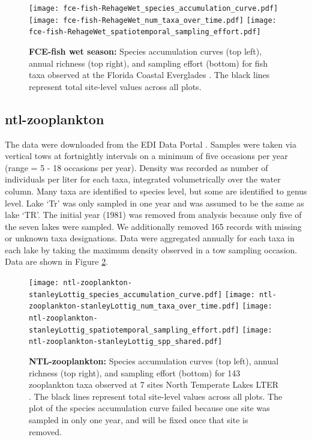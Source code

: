 \documentclass[11pt, oneside]{article}
\begin{document}
\begin{figure}[h!]
\centering
\texttt{[image: fce-fish-RehageWet\_species\_accumulation\_curve.pdf]}
\texttt{[image: fce-fish-RehageWet\_num\_taxa\_over\_time.pdf]}
\texttt{[image: fce-fish-RehageWet\_spatiotemporal\_sampling\_effort.pdf]}
\caption{{\bf FCE-fish wet season:} Species accumulation curves (top left),  annual richness (top right), and sampling effort (bottom)  for fish taxa observed at the Florida Coastal Everglades . The black lines represent total site-level values across all plots.}
\label{fce-fish-wet}
\end{figure}



\newpage
\subsection {ntl-zooplankton}
The data were downloaded from the EDI Data Portal \citep{ntl-zooplankton}.
Samples were taken  via vertical tows at fortnightly intervals on a minimum of five occasions per year (range = 5 - 18 occasions per year).
Density was recorded as number of individuals per liter for each taxa, integrated volumetrically over the water column.
Many taxa are identified to species level, but some are identified to genus level.
Lake `Tr'  was only sampled in one year and was assumed to be the same as lake `TR'. %
The initial year (1981) was removed from analysis because only five of the seven lakes were sampled.
We additionally removed 165 records with missing or unknown taxa designations.
Data were aggregated annually for each taxa in each lake by taking the maximum density observed in a tow sampling occasion.
Data are shown in Figure \ref{ntl-zooplankton}.

\begin{figure}[h!]
\centering
\texttt{[image: ntl-zooplankton-stanleyLottig\_species\_accumulation\_curve.pdf]}
\texttt{[image: ntl-zooplankton-stanleyLottig\_num\_taxa\_over\_time.pdf]}
\texttt{[image: ntl-zooplankton-stanleyLottig\_spatiotemporal\_sampling\_effort.pdf]}
\texttt{[image: ntl-zooplankton-stanleyLottig\_spp\_shared.pdf]}
\caption{{\bf NTL-zooplankton:} Species accumulation curves (top left),  annual richness (top right), and sampling effort (bottom)  for 143 zooplankton taxa observed at 7 sites North Temperate Lakes LTER . The black lines represent total site-level values across all plots. The plot of the species accumulation curve failed because one site was sampled in only one year, and will be fixed once that site is removed.}
\label{ntl-zooplankton}
\end{figure}
\end{document}
